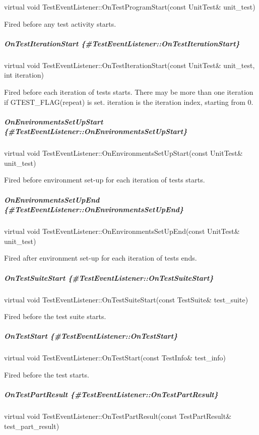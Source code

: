 {\ttfamily virtual void Test\+Event\+Listener\+::\+On\+Test\+Program\+Start(const Unit\+Test\& unit\+\_\+test)}

Fired before any test activity starts.

\subparagraph*{On\+Test\+Iteration\+Start \{\#\+Test\+Event\+Listener\+::\+On\+Test\+Iteration\+Start\}}

{\ttfamily virtual void Test\+Event\+Listener\+::\+On\+Test\+Iteration\+Start(const Unit\+Test\& unit\+\_\+test, int iteration)}

Fired before each iteration of tests starts. There may be more than one iteration if {\ttfamily G\+T\+E\+S\+T\+\_\+\+F\+L\+A\+G(repeat)} is set. {\ttfamily iteration} is the iteration index, starting from 0.

\subparagraph*{On\+Environments\+Set\+Up\+Start \{\#\+Test\+Event\+Listener\+::\+On\+Environments\+Set\+Up\+Start\}}

{\ttfamily virtual void Test\+Event\+Listener\+::\+On\+Environments\+Set\+Up\+Start(const Unit\+Test\& unit\+\_\+test)}

Fired before environment set-\/up for each iteration of tests starts.

\subparagraph*{On\+Environments\+Set\+Up\+End \{\#\+Test\+Event\+Listener\+::\+On\+Environments\+Set\+Up\+End\}}

{\ttfamily virtual void Test\+Event\+Listener\+::\+On\+Environments\+Set\+Up\+End(const Unit\+Test\& unit\+\_\+test)}

Fired after environment set-\/up for each iteration of tests ends.

\subparagraph*{On\+Test\+Suite\+Start \{\#\+Test\+Event\+Listener\+::\+On\+Test\+Suite\+Start\}}

{\ttfamily virtual void Test\+Event\+Listener\+::\+On\+Test\+Suite\+Start(const Test\+Suite\& test\+\_\+suite)}

Fired before the test suite starts.

\subparagraph*{On\+Test\+Start \{\#\+Test\+Event\+Listener\+::\+On\+Test\+Start\}}

{\ttfamily virtual void Test\+Event\+Listener\+::\+On\+Test\+Start(const Test\+Info\& test\+\_\+info)}

Fired before the test starts.

\subparagraph*{On\+Test\+Part\+Result \{\#\+Test\+Event\+Listener\+::\+On\+Test\+Part\+Result\}}

{\ttfamily virtual void Test\+Event\+Listener\+::\+On\+Test\+Part\+Result(const Test\+Part\+Result\& test\+\_\+part\+\_\+result)}

